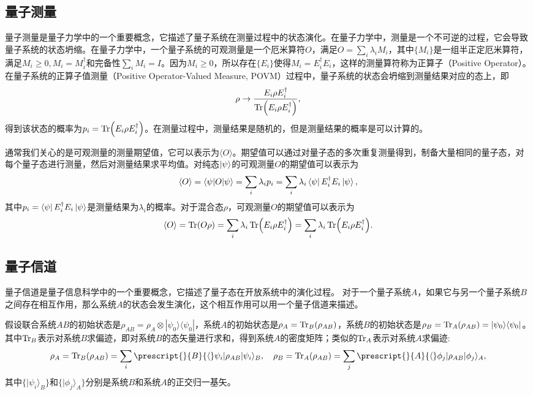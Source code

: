 \subsection{量子测量}
量子测量是量子力学中的一个重要概念，它描述了量子系统在测量过程中的状态演化。在量子力学中，测量是一个不可逆的过程，它会导致量子系统的状态坍缩。在量子力学中，一个量子系统的可观测量是一个厄米算符$O$，满足$O=\sum_i \lambda_i M_i$，其中$\{M_i\}$是一组半正定厄米算符，满足$M_i \geq 0,M_i=M_i^\dagger$和完备性$\sum_i M_i = I$。因为$M_i \geq 0$，所以存在$\{E_i\}$使得$M_i = E_i^\dagger E_i$，这样的测量算符称为正算子（Positive Operator）。
在量子系统的正算子值测量（Positive Operator-Valued Measure, POVM）过程中，量子系统的状态会坍缩到测量结果对应的态上，即
\begin{equation}
    \rho \rightarrow \frac{E_i\rho E_i^\dagger}{\Tr(E_i\rho E_i^\dagger)},
\end{equation}
得到该状态的概率为$p_i = \Tr(E_i\rho E_i^\dagger)$。在测量过程中，测量结果是随机的，但是测量结果的概率是可以计算的。



通常我们关心的是可观测量的测量期望值，它可以表示为$\langle O \rangle$。期望值可以通过对量子态的多次重复测量得到，制备大量相同的量子态，对每个量子态进行测量，然后对测量结果求平均值。对纯态$\ket{\psi}$的可观测量$O$的期望值可以表示为
\begin{equation}
    \langle O \rangle = \langle \psi|O|\psi\rangle=\sum_i \lambda_i p_i=\sum_i \lambda_i \bra{\psi} E_i^\dagger E_i \ket{\psi},
\end{equation}
其中$p_i = \bra{\psi} E_i^\dagger E_i \ket{\psi}$是测量结果为$\lambda_i$的概率。对于混合态$\rho$，可观测量$O$的期望值可以表示为
\begin{equation}
    \langle O \rangle = \Tr(O\rho)=\sum_i \lambda_i \Tr(E_i\rho E_i^\dagger)=\sum_i \lambda_i \Tr(E_i\rho E_i^\dagger).
\end{equation}


\subsection{量子信道}
量子信道是量子信息科学中的一个重要概念，它描述了量子态在开放系统中的演化过程。
对于一个量子系统$A$，如果它与另一个量子系统$B$之间存在相互作用，那么系统$A$的状态会发生演化，这个相互作用可以用一个量子信道来描述。

假设联合系统$AB$的初始状态是$\rho_{AB} = \rho_A \otimes |\psi_0\rangle \langle \psi_0|$，系统$A$的初始状态是$\rho_A = \Tr_B(\rho_{AB})$，系统$B$的初始状态是$\rho_B = \Tr_A(\rho_{AB})=|\psi_0\rangle \langle \psi_0|$。
其中$\Tr_B$表示对系统$B$求偏迹，即对系统$B$的态矢量进行求和，得到系统$A$的密度矩阵；类似的$\Tr_A$表示对系统$A$求偏迹:
\begin{equation}
    \rho_A = \Tr_B(\rho_{AB}) = \sum_i \prescript{}{B}{\langle} \psi_i|\rho_{AB}|\psi_i\rangle_B, \quad \rho_B = \Tr_A(\rho_{AB}) = \sum_j \prescript{}{A}{\langle} \phi_j|\rho_{AB}|\phi_j\rangle_A,
\end{equation}
其中$\{|\psi_i\rangle_B\}$和$\{|\phi_j\rangle_A\}$分别是系统$B$和系统$A$的正交归一基矢。

